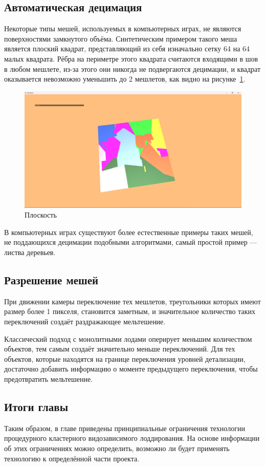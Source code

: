 \subsection*{Автоматическая децимация}
Некоторые типы мешей, используемых в компьютерных играх, не являются поверхностями замкнутого объёма.
Синтетическим примером такого меша является плоский квадрат, представляющий из себя изначально сетку 64 на 64 малых квадрата.
Рёбра на периметре этого квадрата считаются входящими в шов в любом мешлете, из-за этого они никогда не подвергаются децимации, и квадрат оказывается невозможно уменьшить до 2 мешлетов, как видно на рисунке~\ref{fig:plane-1}.
\begin{figure}[ht]
    \centering
    \includegraphics[width=\textwidth]{pics/plane1.png}
    \caption{Плоскость}
    \label{fig:plane-1}
\end{figure}

В компьютерных играх существуют более естественные примеры таких мешей, не поддающихся децимации подобными алгоритмами, самый простой пример --- листва деревьев.

\subsection*{Разрешение мешей}
При движении камеры переключение тех мешлетов, треугольники которых имеют размер более 1 пикселя, становится заметным, и значительное количество таких переключений создаёт раздражающее мельтешение.

Классический подход с монолитными лодами оперирует меньшим количеством объектов, тем самым создаёт значительно меньше переключений.
Для тех объектов, которые находятся на границе переключения уровней детализации, достаточно добавить информацию о моменте предыдущего переключения, чтобы предотвратить мельтешение.

\subsection*{Итоги главы}
Таким образом, в главе приведены принципиальные ограничения технологии процедурного кластерного видозависимого лоддирования.
На основе информации об этих ограничениях можно определить, возможно ли будет применять технологию к определённой части проекта.
